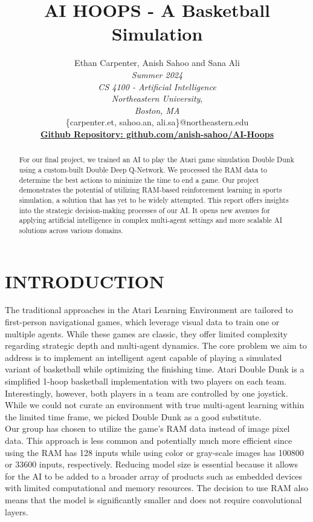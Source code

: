\documentclass[letterpaper, 10 pt, conference]{ieeeconf}
\title{\LARGE \bf
AI HOOPS - A Basketball Simulation\\
}
\author{Ethan Carpenter, Anish Sahoo and Sana Ali\\
\textit{Summer 2024}\\
\textit{CS 4100 - Artificial Intelligence}\\
\textit{Northeastern University},\\
\textit{Boston, MA}\\
\{carpenter.et, sahoo.an, ali.sa\}@northeastern.edu \\
\href{https://github.com/anish-sahoo/AI-Hoops}{\textbf{Github Repository: github.com/anish-sahoo/AI-Hoops}} \\
}
\begin{document}
\maketitle
\thispagestyle{empty}
\pagestyle{empty}

\begin{abstract}
For our final project, we trained an AI to play the Atari game simulation Double Dunk using a custom-built Double Deep Q-Network. We processed the RAM data to determine the best actions to minimize the time to end a game. Our project demonstrates the potential of utilizing RAM-based reinforcement learning in sports simulation, a solution that has yet to be widely attempted. This report offers insights into the strategic decision-making processes of our AI. It opens new avenues for applying artificial intelligence in complex multi-agent settings and more scalable AI solutions across various domains.\\

\end{abstract} 

\section{\textbf{INTRODUCTION}}
\vspace{.5cm}
The traditional approaches in the Atari Learning Environment are tailored to first-person navigational games, which leverage visual data to train one or multiple agents. While these games are classic, they offer limited complexity regarding strategic depth and multi-agent dynamics. The core problem we aim to address is to implement an intelligent agent capable of playing a simulated variant of basketball while optimizing the finishing time. Atari Double Dunk is a simplified 1-hoop basketball implementation with two players on each team. Interestingly, however, both players in a team are controlled by one joystick. While we could not curate an environment with true multi-agent learning within the limited time frame, we picked Double Dunk as a good substitute.\\

Our group has chosen to utilize the game’s RAM data instead of image pixel data. This approach is less common and potentially much more efficient since using the RAM has 128 inputs while using color or gray-scale images has 100800 or 33600 inputs, respectively. Reducing model size is essential because it allows for the AI to be added to a broader array of products such as embedded devices with limited computational and memory resources. The decision to use RAM also means that the model is significantly smaller and does not require convolutional layers. \\
\end{document}
